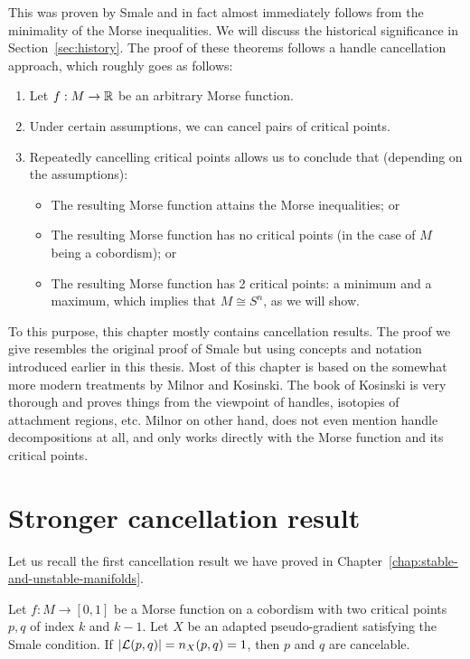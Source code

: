This was proven by Smale and in fact almost immediately follows from the minimality of the Morse inequalities.
We will discuss the historical significance in Section~\ref{sec:history}.
The proof of these theorems follows a handle cancellation approach, which roughly goes as follows:
\begin{enumerate}[(1)]
    \item Let $f: M \to  \mathbb{R}$ be an arbitrary Morse function.
    \item Under certain assumptions, we can cancel pairs of critical points.
    \item Repeatedly cancelling critical points allows us to conclude that (depending on the assumptions):
        \begin{itemize}
            \item The resulting Morse function attains the Morse inequalities; or
            \item The resulting Morse function has no critical points (in the case of $M$ being a cobordism); or
            \item The resulting Morse function has 2 critical points: a minimum and a maximum, which implies that $M \cong S^{n}$, as we will show.
        \end{itemize}
\end{enumerate}

To this purpose, this chapter mostly contains cancellation results.
The proof we give resembles the original proof of Smale but using concepts and notation introduced earlier in this thesis.
Most of this chapter is based on the somewhat more modern treatments by Milnor and Kosinski.
The book of Kosinski is very thorough and proves things from the viewpoint of handles, isotopies of attachment regions, etc.
Milnor on other hand, does not even mention handle decompositions at all, and only works directly with the Morse function and its critical points.




\section{Stronger cancellation result}
Let us recall the first cancellation result we have proved in Chapter~\ref{chap:stable-and-unstable-manifolds}.

\begingroup
\def\thetheorem{\ref{firstcancellation}}
\begin{theorem}
    Let $f: M \to  [0,1]$ be a Morse function on a cobordism with two critical points $p, q$ of index $k$ and  $k-1$. Let $X$ be an adapted pseudo-gradient satisfying the Smale condition.
    If $|\mathcal L(p, q) | = n_{X}(p, q) = 1$, then $p$ and  $q$ are cancelable.
\end{theorem}
\addtocounter{theorem}{-1}
\endgroup

